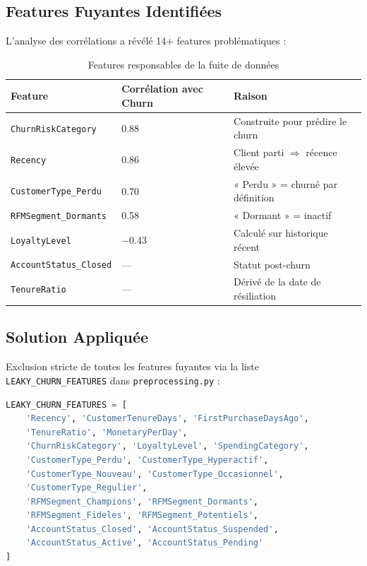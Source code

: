 \documentclass[12pt,a4paper]{article}
\begin{document}
\subsection{Features Fuyantes Identifiées}

L'analyse des corrélations a révélé 14+ features problématiques :

\begin{table}[H]
\centering
\caption{Features responsables de la fuite de données}
\begin{tabular}{lll}
\toprule
\textbf{Feature} & \textbf{Corrélation avec Churn} & \textbf{Raison} \\
\midrule
\texttt{ChurnRiskCategory} & 0.88 & Construite pour prédire le churn \\
\texttt{Recency} & 0.86 & Client parti $\Rightarrow$ récence élevée \\
\texttt{CustomerType\_Perdu} & 0.70 & « Perdu » = churné par définition \\
\texttt{RFMSegment\_Dormants} & 0.58 & « Dormant » = inactif \\
\texttt{LoyaltyLevel} & $-$0.43 & Calculé sur historique récent \\
\texttt{AccountStatus\_Closed} & — & Statut post-churn \\
\texttt{TenureRatio} & — & Dérivé de la date de résiliation \\
\bottomrule
\end{tabular}
\end{table}

\subsection{Solution Appliquée}

Exclusion stricte de toutes les features fuyantes via la liste \texttt{LEAKY\_CHURN\_FEATURES}
dans \texttt{preprocessing.py} :

\begin{lstlisting}[language=Python, caption=Exclusion des features fuyantes]
LEAKY_CHURN_FEATURES = [
    'Recency', 'CustomerTenureDays', 'FirstPurchaseDaysAgo',
    'TenureRatio', 'MonetaryPerDay',
    'ChurnRiskCategory', 'LoyaltyLevel', 'SpendingCategory',
    'CustomerType_Perdu', 'CustomerType_Hyperactif',
    'CustomerType_Nouveau', 'CustomerType_Occasionnel',
    'CustomerType_Regulier',
    'RFMSegment_Champions', 'RFMSegment_Dormants',
    'RFMSegment_Fideles', 'RFMSegment_Potentiels',
    'AccountStatus_Closed', 'AccountStatus_Suspended',
    'AccountStatus_Active', 'AccountStatus_Pending'
]
\end{lstlisting}
\end{document}
